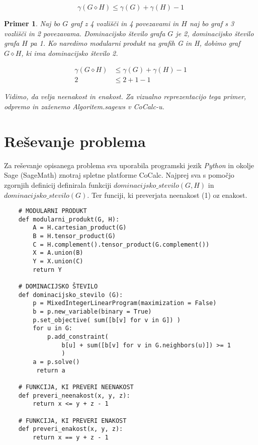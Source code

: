 \documentclass[a4paper,12pt]{article}
\newtheorem{primer}{Primer}
\begin{document}
\begin{equation}
    \gamma(G\diamond H) \leq \gamma (G) + \gamma (H) - 1
\end{equation}

\begin{primer}
    Naj bo $G$ graf z 4 vozlišči in 4 povezavami in $H$ naj bo graf s 3 vozlišči in 
    2 povezavama. Dominacijsko število grafa $G$ je 2, dominacijsko število grafa $H$ pa 1. Ko naredimo modularni produkt na grafih G in H, 
    dobimo graf $G \diamond H$, ki ima dominacijsko število 2. 

    \begin{align*} 
        \gamma(G\diamond H) &\leq \gamma (G) + \gamma (H) - 1 \\ 
        2 &\leq 2 + 1 - 1
    \end{align*}
    
    \noindent Vidimo, da velja neenakost in enakost. Za vizualno reprezentacijo tega primer,
    odpremo in zaženemo Algoritem.sagews v CoCalc-u.

\end{primer}

\section{Reševanje problema}
Za reševanje opisanega problema sva uporabila programski jezik \emph{Python} in okolje Sage (SageMath) znotraj spletne platforme CoCalc.
Najprej sva s pomočjo zgornjih definicij definirala funkciji $dominacijsko\_stevilo(G, H)$ in $dominacijsko\_stevilo(G)$.
Ter funciji, ki preverjata neenakost (1) oz enakost.

\begin{verbatim}
    # MODULARNI PRODUKT
    def modularni_produkt(G, H):
        A = H.cartesian_product(G)
        B = H.tensor_product(G)
        C = H.complement().tensor_product(G.complement())
        X = A.union(B)
        Y = X.union(C)
        return Y
    
    # DOMINACIJSKO ŠTEVILO
    def dominacijsko_stevilo (G):
        p = MixedIntegerLinearProgram(maximization = False)
        b = p.new_variable(binary = True)
        p.set_objective( sum([b[v] for v in G]) )
        for u in G:
            p.add_constraint( 
                b[u] + sum([b[v] for v in G.neighbors(u)]) >= 1 
                )
        a = p.solve()
         return a

    # FUNKCIJA, KI PREVERI NEENAKOST
    def preveri_neenakost(x, y, z):
        return x <= y + z - 1

    # FUNKCIJA, KI PREVERI ENAKOST 
    def preveri_enakost(x, y, z):
        return x == y + z - 1
\end{verbatim}
\end{document}
